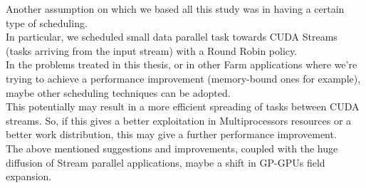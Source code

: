  Another assumption on which we based all this study was in having a certain type of scheduling.\\
 In particular, we scheduled small data parallel task towards CUDA Streams (tasks arriving from the input stream) with a Round Robin policy.\\ In the problems treated in this thesis, or in other Farm applications where we're trying to achieve a performance improvement (memory-bound ones for example), maybe other scheduling techniques can be adopted.\\
  This potentially may result in a more efficient spreading of tasks between CUDA streams. So, if this gives a better exploitation in Multiprocessors resources or a better work distribution, this may give a further performance improvement.\\
  The above mentioned suggestions and improvements, coupled with the huge diffusion of Stream parallel applications, maybe a shift in GP-GPUs field expansion.
 